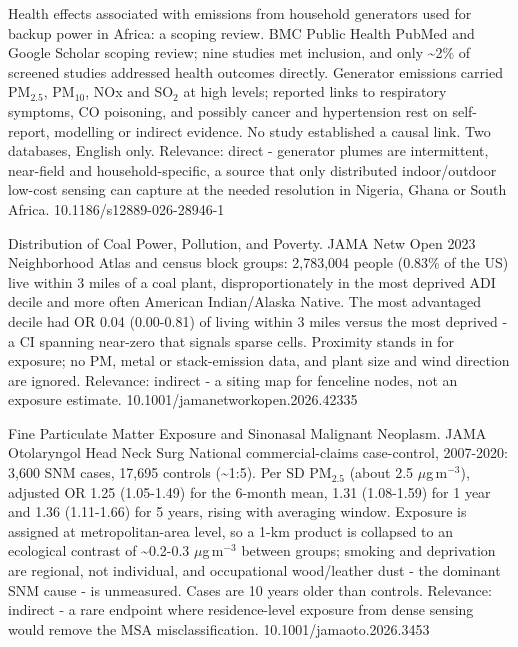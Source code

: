 \documentclass[10pt]{article}
\begin{document}
\par{}\baselineskip{}\baselineskip
{}

{Health effects associated with emissions from household generators used for backup power in Africa: a scoping review.}
{BMC Public Health}
{PubMed and Google Scholar scoping review; nine studies met inclusion, and only \textasciitilde{}2\% of screened studies addressed health outcomes directly. Generator emissions carried PM$_{2.5}$, PM$_{10}$, NOx and SO$_2$ at high levels; reported links to respiratory symptoms, CO poisoning, and possibly cancer and hypertension rest on self-report, modelling or indirect evidence. No study established a causal link. Two databases, English only. Relevance: direct - generator plumes are intermittent, near-field and household-specific, a source that only distributed indoor/outdoor low-cost sensing can capture at the needed resolution in Nigeria, Ghana or South Africa.}
{10.1186/s12889-026-28946-1}

{Distribution of Coal Power, Pollution, and Poverty.}
{JAMA Netw Open}
{2023 Neighborhood Atlas and census block groups: 2,783,004 people (0.83\% of the US) live within 3 miles of a coal plant, disproportionately in the most deprived ADI decile and more often American Indian/Alaska Native. The most advantaged decile had OR 0.04 (0.00-0.81) of living within 3 miles versus the most deprived - a CI spanning near-zero that signals sparse cells. Proximity stands in for exposure; no PM, metal or stack-emission data, and plant size and wind direction are ignored. Relevance: indirect - a siting map for fenceline nodes, not an exposure estimate.}
{10.1001/jamanetworkopen.2026.42335}

\par{}\baselineskip{}\baselineskip
{}

{Fine Particulate Matter Exposure and Sinonasal Malignant Neoplasm.}
{JAMA Otolaryngol Head Neck Surg}
{National commercial-claims case-control, 2007-2020: 3,600 SNM cases, 17,695 controls (\textasciitilde{}1:5). Per SD PM$_{2.5}$ (about 2.5 $\mu$g\,m$^{-3}$), adjusted OR 1.25 (1.05-1.49) for the 6-month mean, 1.31 (1.08-1.59) for 1 year and 1.36 (1.11-1.66) for 5 years, rising with averaging window. Exposure is assigned at metropolitan-area level, so a 1-km product is collapsed to an ecological contrast of \textasciitilde{}0.2-0.3 $\mu$g\,m$^{-3}$ between groups; smoking and deprivation are regional, not individual, and occupational wood/leather dust - the dominant SNM cause - is unmeasured. Cases are 10 years older than controls. Relevance: indirect - a rare endpoint where residence-level exposure from dense sensing would remove the MSA misclassification.}
{10.1001/jamaoto.2026.3453}
\end{document}
